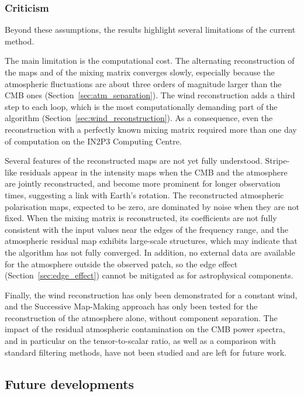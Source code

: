 \documentclass[a4paper,11pt]{article}
\begin{document}
\subsubsection{Criticism}

Beyond these assumptions, the results highlight several limitations of the current method.

The main limitation is the computational cost. The alternating reconstruction of the maps and of the mixing matrix converges slowly, especially because the atmospheric fluctuations are about three orders of magnitude larger than the CMB ones (Section~\ref{sec:atm_separation}). The wind reconstruction adds a third step to each loop, which is the most computationally demanding part of the algorithm (Section~\ref{sec:wind_reconstruction}). As a consequence, even the reconstruction with a perfectly known mixing matrix required more than one day of computation on the IN2P3 Computing Centre.

Several features of the reconstructed maps are not yet fully understood. Stripe-like residuals appear in the intensity maps when the CMB and the atmosphere are jointly reconstructed, and become more prominent for longer observation times, suggesting a link with Earth's rotation. The reconstructed atmospheric polarisation maps, expected to be zero, are dominated by noise when they are not fixed. When the mixing matrix is reconstructed, its coefficients are not fully consistent with the input values near the edges of the frequency range, and the atmospheric residual map exhibits large-scale structures, which may indicate that the algorithm has not fully converged. In addition, no external data are available for the atmosphere outside the observed patch, so the edge effect (Section~\ref{sec:edge_effect}) cannot be mitigated as for astrophysical components.

Finally, the wind reconstruction has only been demonstrated for a constant wind, and the Successive Map-Making approach has only been tested for the reconstruction of the atmosphere alone, without component separation. The impact of the residual atmospheric contamination on the CMB power spectra, and in particular on the tensor-to-scalar ratio, as well as a comparison with standard filtering methods, have not been studied and are left for future work.

\subsection{Future developments}
\end{document}
